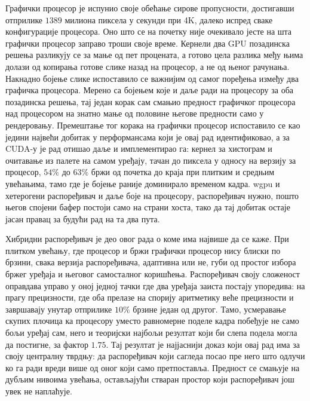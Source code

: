 \documentclass[serbian]{ftndiplomski}
\begin{document}
Графички процесор је испунио своје обећање сирове пропусности, достигавши отприлике
$1389$ милиона пиксела у секунди при 4K, далеко испред сваке конфигурације процесора.
Оно што се на почетку није очекивало јесте на шта графички процесор заправо троши
своје време. Кернели два GPU позадинска решења разликују се за мање од пет процената,
а готово цела разлика међу њима долази од копирања готове слике назад на процесор, а
не од њеног рачунања. Накнадно бојење слике испоставило се важнијим од самог
поређења између два графичка процесора. Мерено са бојењем које и даље ради на
процесору за оба позадинска решења, тај један корак сам смањио предност
графичког процесора над процесором на знатно мање од половине његове предности само
у рендеровању. Премештање тог корака на графички процесор испоставило се као једини
највећи добитак у перформансама који је овај рад идентификовао, а за CUDA-у је рад
отишао даље и имплементирао га: кернел за хистограм и очитавање из палете на самом
уређају, тачан до пиксела у односу на верзију за процесор, $54\%$ до $63\%$ бржи од
почетка до краја при плитким и средњим увећањима, тамо где је бојење раније
доминирало временом кадра. wgpu и хетерогени распоређивач и даље боје на процесору,
распоређивач нужно, пошто његов спојени бафер постоји само на страни хоста, тако да
тај добитак остаје јасан правац за будући рад на та два пута.

Хибридни распоређивач је део овог рада о коме има највише да се каже. При плитком увећању,
где процесор и бржи графички процесор нису блиски по брзини, свака верзија
распоређивача, адаптивна или не, губи од простог избора бржег уређаја и његовог
самосталног коришћења. Распоређивач своју сложеност оправдава управо у оној једној
тачки где два уређаја заиста постају упоредива: на прагу прецизности, где оба
прелазе на спорију аритметику веће прецизности и завршавају унутар отприлике $10\%$
брзине један од другог. Тамо, усмеравање скупих плочица ка процесору уместо
равномерне поделе кадра побеђује не само бољи уређај сам, него и теоријски најбољи
резултат који би слепа подела могла да постигне, за фактор $1.75$. Тај резултат је
најјаснији доказ који овај рад има за своју централну тврдњу: да распоређивач који
сагледа посао пре него што одлучи ко га ради вреди више од оног који само
претпоставља. Предност се смањује на дубљим нивоима увећања, остављајући стваран
простор који распоређивач још увек не наплаћује.
\end{document}
